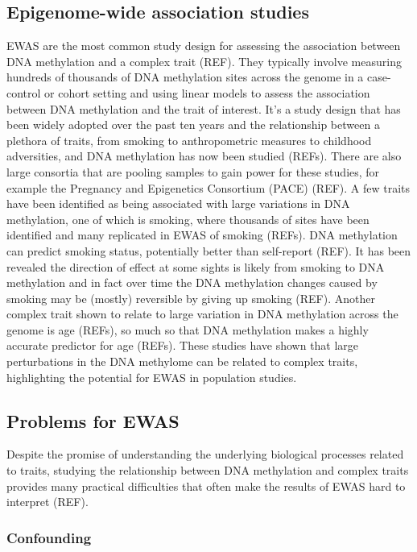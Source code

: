 \documentclass[11pt,twoside]{bristolthesis}
\begin{document}
\hypertarget{ewas}{%
\subsection{Epigenome-wide association studies}\label{ewas}}

EWAS are the most common study design for assessing the association between DNA methylation and a complex trait (REF). They typically involve measuring hundreds of thousands of DNA methylation sites across the genome in a case-control or cohort setting and using linear models to assess the association between DNA methylation and the trait of interest. It's a study design that has been widely adopted over the past ten years and the relationship between a plethora of traits, from smoking to anthropometric measures to childhood adversities, and DNA methylation has now been studied (REFs). There are also large consortia that are pooling samples to gain power for these studies, for example the Pregnancy and Epigenetics Consortium (PACE) (REF). A few traits have been identified as being associated with large variations in DNA methylation, one of which is smoking, where thousands of sites have been identified and many replicated in EWAS of smoking (REFs). DNA methylation can predict smoking status, potentially better than self-report (REF). It has been revealed the direction of effect at some sights is likely from smoking to DNA methylation and in fact over time the DNA methylation changes caused by smoking may be (mostly) reversible by giving up smoking (REF). Another complex trait shown to relate to large variation in DNA methylation across the genome is age (REFs), so much so that DNA methylation makes a highly accurate predictor for age (REFs). These studies have shown that large perturbations in the DNA methylome can be related to complex traits, highlighting the potential for EWAS in population studies.

\hypertarget{problems-for-ewas}{%
\subsection{Problems for EWAS}\label{problems-for-ewas}}

Despite the promise of understanding the underlying biological processes related to traits, studying the relationship between DNA methylation and complex traits provides many practical difficulties that often make the results of EWAS hard to interpret (REF).

\hypertarget{confounding}{%
\subsubsection{Confounding}\label{confounding}}
\end{document}
